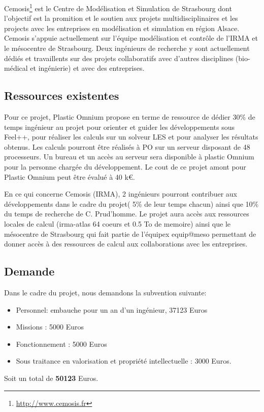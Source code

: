 \documentclass[12pt]{article}
\begin{document}
Cemosis\footnote{\url{http://www.cemosis.fr}} est le Centre de Modélisation et
Simulation de Strasbourg dont l'objectif est la promition et le soutien aux
projets multidisciplinaires et les projects avec les entreprises en modélisation
et simulation en région Alsace. Cemosis s'appuie actuellement sur l'équipe
modélisation et contrôle de l'IRMA et le mésocentre de Strasbourg. Deux
ingénieurs de recherche y sont actuellement dédiés et travaillents sur des
projets collaboratifs avec d'autres disciplines (bio-médical et ingénierie) et
avec des entreprises.

\subsection{Ressources existentes}

Pour ce projet, Plastic Omnium propose en terme de ressource de dédier 30\%
de temps ingénieur au projet pour orienter et guider les développements sous
Feel++, pour réaliser les calculs sur un solveur LES et pour analyser les
résultats obtenus. Les calculs pourront être réalisés à PO sur un serveur
disposant de 48 processeurs. Un bureau et un accès au serveur sera disponible à
plastic Omnium pour la personne chargée du développement. Le cout de ce projet
amont pour Plastic Omnium peut être évalué à 40 k€.

En ce qui concerne Cemosis (IRMA), 2 ingénieurs pourront contribuer aux
développements dans le cadre du projet( 5\% de leur temps chacun) ainsi que 10\%
du temps de recherche de C. Prud'homme. Le projet aura accès aux ressources
locales de calcul (irma-atlas 64 coeurs et 0.5 To de memoire) ainsi que le
mésocentre de Strasbourg qui fait partie de l'équipex equip@meso permettant de
donner accès à des ressources de calcul aux collaborations avec les entreprises.

\subsection{Demande}


Dans le cadre du projet, nous demandons la subvention suivante:
\begin{itemize}
\item Personnel: embauche pour un an d'un ingénieur, 37123 Euros
\item Missions : 5000 Euros
\item Fonctionnement  : 5000 Euros
\item Sous traitance en valorisation et propriété intellectuelle : 3000 Euros.
\end{itemize}
Soit un total de \textbf{50123} Euros.
\end{document}
